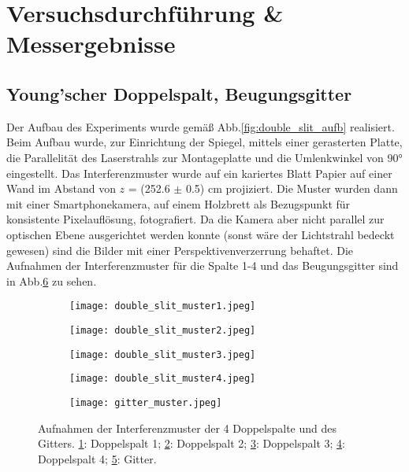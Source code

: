 \section{Versuchsdurchführung \& Messergebnisse}
\label{sec:versuchdurchfuehrung-messergebnisse}

\subsection{Young'scher Doppelspalt, Beugungsgitter}
\label{sec:durch:yng}
Der Aufbau des Experiments wurde gemäß Abb.\ref{fig:double_slit_aufb} realisiert.
Beim Aufbau wurde, zur Einrichtung der Spiegel, mittels einer gerasterten Platte, die Parallelität des Laserstrahls zur Montageplatte und die Umlenkwinkel von 90° eingestellt.
Das Interferenzmuster wurde auf ein kariertes Blatt Papier auf einer Wand im Abstand von $z$ = (252.6 $\pm$ 0.5) cm projiziert.
Die Muster wurden dann mit einer Smartphonekamera, auf einem Holzbrett als Bezugspunkt für konsistente Pixelauflösung, fotografiert.
Da die Kamera aber nicht parallel zur optischen Ebene ausgerichtet werden konnte (sonst wäre der Lichtstrahl bedeckt gewesen) sind die Bilder mit einer Perspektivenverzerrung behaftet.
Die Aufnahmen der Interferenzmuster für die Spalte 1-4 und das Beugungsgitter sind in Abb.\ref{fig:interf_muster} zu sehen.
\begin{figure}[h]
    \centering
    \begin{subfigure}[t]{0.4\textwidth}
        \texttt{[image: double\_slit\_muster1.jpeg]}
        \caption{}
        \label{fig:double_slit_muster1}
    \end{subfigure}%
    \begin{subfigure}[t]{0.4\textwidth}
        \texttt{[image: double\_slit\_muster2.jpeg]}
        \caption{}
        \label{fig:double_slit_muster2}
    \end{subfigure}
    \begin{subfigure}[t]{0.4\textwidth}
        \texttt{[image: double\_slit\_muster3.jpeg]}
        \caption{}
        \label{fig:double_slit_muster3}
    \end{subfigure}%
    \begin{subfigure}[t]{0.4\textwidth}
        \texttt{[image: double\_slit\_muster4.jpeg]}
        \caption{}
        \label{fig:double_slit_muster4}
    \end{subfigure}
    \begin{subfigure}[t]{0.4\textwidth}
        \texttt{[image: gitter\_muster.jpeg]}
        \caption{}
        \label{fig:gitter_muster}
    \end{subfigure}

    \caption{
        Aufnahmen der Interferenzmuster der 4 Doppelspalte und des Gitters.
        \ref{fig:double_slit_muster1}: Doppelspalt 1; 
        \ref{fig:double_slit_muster2}: Doppelspalt 2; 
        \ref{fig:double_slit_muster3}: Doppelspalt 3; 
        \ref{fig:double_slit_muster4}: Doppelspalt 4; 
        \ref{fig:gitter_muster}: Gitter.
    }
    \label{fig:interf_muster}
\end{figure}


